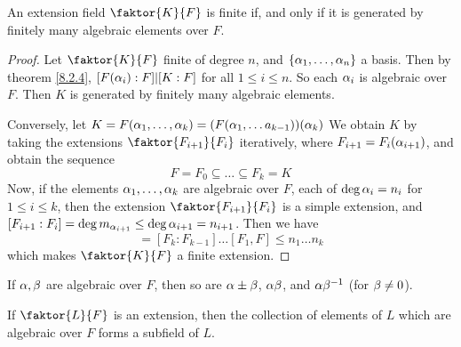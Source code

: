   \begin{theorem}\label{theorem_8.2.6}
    An extension field $\faktor{K}{F}$ is finite if, and only if it is
    generated by finitely many algebraic elements over $F$.
  \end{theorem}
  \begin{proof}
    Let $\faktor{K}{F}$ finite of degree $n$, and  $\{\alpha_1, \dots, \alpha_n\}$ a
    basis. Then by theorem \ref{8.2.4},  $[F(\alpha_i):F]|[K:F]$ for all $1 \leq i
    \leq n$. So each  $\alpha_i$ is algebraic over  $F$. Then  $K$ is generated by
    finitely many algebraic elements.

    Conversely, let $K=F(\alpha_1, \dots, \alpha_k)=(F(\alpha_1, \dots a_{k-1}))(\alpha_k)$ We
    obtain $K$ by taking the extensions $\faktor{F_{i+1}}{F_i}$ iteratively,
    where $F_{i+1}=F_i(\alpha_{i+1})$, and obtain the sequence
    \begin{equation*}
      F=F_0 \subseteq \dots \subseteq F_k=K
    \end{equation*}
    Now, if the elements $\alpha_1, \dots, \alpha_k$ are algebraic over $F$, each of
    $\deg{\alpha_i}=n_i$ for $1 \leq i \leq k$, then the extension
    $\faktor{F_{i+1}}{F_i}$ is a simple extension, and
    $[F_{i+1}:F_i]=\deg{m_{\alpha_{i+1}}} \leq \deg{\alpha_{i+1}}=n_{i+1}$. Then we
    have
    \begin{equation*}
      [K:F]=[F_k:F_{k-1}] \dots [F_1,F] \leq n_1 \dots n_k
    \end{equation*}
    which makes $\faktor{K}{F}$ a finite extension.
  \end{proof}
  \begin{corollary}
    If $\alpha,\beta$ are algebraic over $F$, then so are $\alpha \pm \beta$,  $\alpha\beta$, and
    $\alpha\beta^{-1}$ (for $\beta \neq 0$).
  \end{corollary}
  \begin{corollary}
    If $\faktor{L}{F}$ is an extension, then the collection of elements of $L$
    which are algebraic over  $F$ forms a subfield of  $L$.
  \end{corollary}

